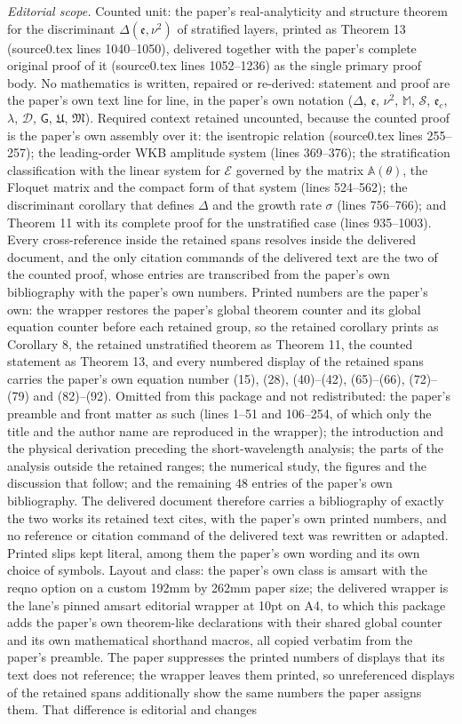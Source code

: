 \documentclass[10pt,a4paper]{amsart}
\newcommand{\Msf}{\mathsf{G}}
\newcommand{\A}{\boldsymbol{\mathfrak{U}}}              %
\newcommand{\B}{{\mathfrak{M}}}
\newcommand{\D}{\mathcal{D}}
\newcommand{\ee}{\mathfrak{e}}
\begin{document}
\noindent\textit{Editorial scope.} Counted unit: the paper's real-analyticity and structure theorem for the discriminant $\Delta(\ee,\nu^2)$ of stratified layers, printed as Theorem 13 (source0.tex lines 1040--1050), delivered together with the paper's complete original proof of it (source0.tex lines 1052--1236) as the single primary proof body. No mathematics is written, repaired or re-derived: statement and proof are the paper's own text line for line, in the paper's own notation ($\Delta$, $\ee$, $\nu^2$, $\mathbb M$, $\mathcal S$, $\ee_c$, $\lambda$, $\D$, $\Msf$, $\A$, $\B$). Required context retained uncounted, because the counted proof is the paper's own assembly over it: the isentropic relation (source0.tex lines 255--257); the leading-order WKB amplitude system (lines 369--376); the stratification classification with the linear system for $\boldsymbol{\mathcal E}$ governed by the matrix $\mathbb A(\theta)$, the Floquet matrix and the compact form of that system (lines 524--562); the discriminant corollary that defines $\Delta$ and the growth rate $\sigma$ (lines 756--766); and Theorem 11 with its complete proof for the unstratified case (lines 935--1003). Every cross-reference inside the retained spans resolves inside the delivered document, and the only citation commands of the delivered text are the two of the counted proof, whose entries are transcribed from the paper's own bibliography with the paper's own numbers. Printed numbers are the paper's own: the wrapper restores the paper's global theorem counter and its global equation counter before each retained group, so the retained corollary prints as Corollary 8, the retained unstratified theorem as Theorem 11, the counted statement as Theorem 13, and every numbered display of the retained spans carries the paper's own equation number (15), (28), (40)--(42), (65)--(66), (72)--(79) and (82)--(92). Omitted from this package and not redistributed: the paper's preamble and front matter as such (lines 1--51 and 106--254, of which only the title and the author name are reproduced in the wrapper); the introduction and the physical derivation preceding the short-wavelength analysis; the parts of the analysis outside the retained ranges; the numerical study, the figures and the discussion that follow; and the remaining 48 entries of the paper's own bibliography. The delivered document therefore carries a bibliography of exactly the two works its retained text cites, with the paper's own printed numbers, and no reference or citation command of the delivered text was rewritten or adapted. Printed slips kept literal, among them the paper's own wording and its own choice of symbols. Layout and class: the paper's own class is amsart with the reqno option on a custom 192mm by 262mm paper size; the delivered wrapper is the lane's pinned amsart editorial wrapper at 10pt on A4, to which this package adds the paper's own theorem-like declarations with their shared global counter and its own mathematical shorthand macros, all copied verbatim from the paper's preamble. The paper suppresses the printed numbers of displays that its text does not reference; the wrapper leaves them printed, so unreferenced displays of the retained spans additionally show the same numbers the paper assigns them. That difference is editorial and changes 
\end{document}
